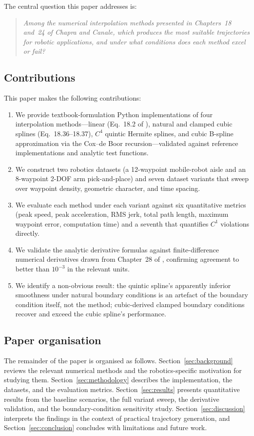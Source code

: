 The central question this paper addresses is:

\begin{quote}
\itshape Among the numerical interpolation methods presented in
Chapters~18 and~24 of Chapra and Canale, which produces the most
suitable trajectories for robotic applications, and under what
conditions does each method excel or fail?
\end{quote}

\subsection{Contributions}
\label{sec:contributions}

This paper makes the following contributions:

\begin{enumerate}[leftmargin=*]
\item We provide textbook-formulation Python implementations of four
interpolation methods---linear (Eq.~18.2 of \cite{chapra2021}),
natural and clamped cubic splines (Eq.~18.36--18.37), $C^4$ quintic
Hermite splines, and cubic B-spline approximation via the Cox--de
Boor recursion---validated against reference implementations and
analytic test functions.
\item We construct two robotics datasets (a 12-waypoint mobile-robot
aisle and an 8-waypoint 2-DOF arm pick-and-place) and seven dataset
variants that sweep over waypoint density, geometric character, and
time spacing.
\item We evaluate each method under each variant against six
quantitative metrics (peak speed, peak acceleration, RMS jerk, total
path length, maximum waypoint error, computation time) and a seventh
that quantifies $C^1$ violations directly.
\item We validate the analytic derivative formulas against
finite-difference numerical derivatives drawn from Chapter~28 of
\cite{chapra2021}, confirming agreement to better than $10^{-3}$ in
the relevant units.
\item We identify a non-obvious result: the quintic spline's
apparently inferior smoothness under natural boundary conditions is
an artefact of the boundary condition itself, not the method;
cubic-derived clamped boundary conditions recover and exceed the
cubic spline's performance.
\end{enumerate}

\subsection{Paper organisation}

The remainder of the paper is organised as follows.
Section~\ref{sec:background} reviews the relevant numerical methods
and the robotics-specific motivation for studying them.
Section~\ref{sec:methodology} describes the implementation, the
datasets, and the evaluation metrics. Section~\ref{sec:results}
presents quantitative results from the baseline scenarios, the full
variant sweep, the derivative validation, and the boundary-condition
sensitivity study. Section~\ref{sec:discussion} interprets the
findings in the context of practical trajectory generation, and
Section~\ref{sec:conclusion} concludes with limitations and future
work.
